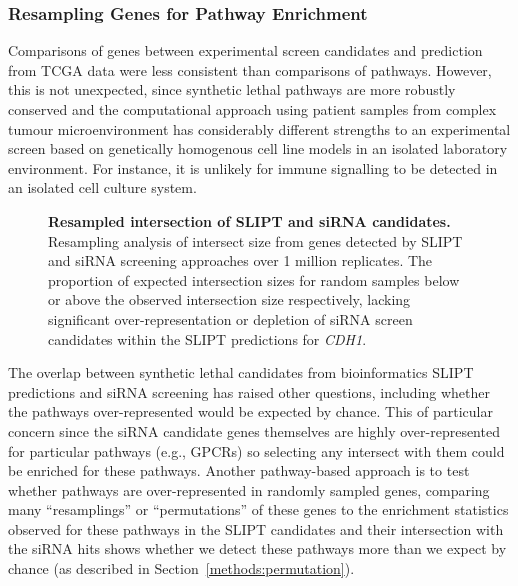 \FloatBarrier

\subsubsection{Resampling Genes for Pathway Enrichment} \label{chapt3:compare_pathway_perm}

Comparisons of genes between experimental screen candidates and prediction from \gls{TCGA}  data were less consistent than comparisons of pathways. However, this is not unexpected, since \gls{synthetic lethal} pathways are more robustly conserved \citep{Dixon2008} and the computational approach using patient samples from complex tumour microenvironment has considerably different strengths to an experimental screen \citep{Telford2015} based on genetically homogenous cell line models in an isolated laboratory environment. For instance, it is unlikely for immune signalling to be detected in an isolated cell culture system.

\begin{figure}[!ht]
  \centering
   \caption[Resampled intersection of SLIPT and \gls{siRNA} candidates]{\small \textbf{Resampled intersection of \gls{SLIPT} and \gls{siRNA} candidates.} Resampling analysis of intersect size from genes detected by \gls{SLIPT} and \gls{siRNA} screening approaches over 1 million replicates. The proportion of expected intersection sizes for random samples below or above the observed intersection size respectively, lacking significant over-represent\-ation or depletion of \gls{siRNA} screen candidates within the \gls{SLIPT} predictions for \textit{CDH1}.
}
\label{fig:perm_sample}
\end{figure}

The overlap between \gls{synthetic lethal} candidates from \gls{bioinformatics} \gls{SLIPT} predictions and \gls{siRNA} screening has raised other questions, including whether the pathways over-represented would be expected by chance. This of particular concern since the \gls{siRNA} candidate genes themselves are highly over-represented for particular pathways (e.g., \glspl{GPCR}) so selecting any intersect with them could be enriched for these pathways. Another pathway-based approach is to test whether pathways are over-represented in randomly sampled genes, comparing many ``resamplings'' or ``permutations'' of these genes to the enrichment statistics observed for these pathways in the \gls{SLIPT} candidates and their intersection with the \gls{siRNA} hits shows whether we detect these pathways more than we expect by chance (as described in Section~\ref{methods:permutation}). 

